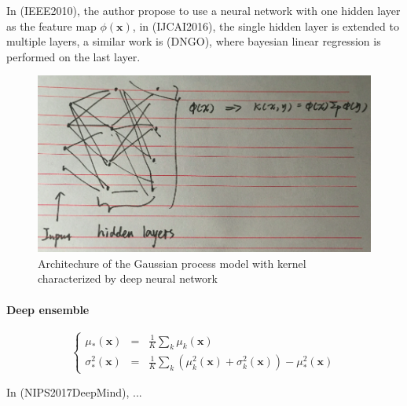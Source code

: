\begin{equation}
\end{equation}

\begin{equation}
\end{equation}

In (IEEE2010), the author propose to use a neural network with one hidden layer as the feature map $\phi(\bm{x})$, in (IJCAI2016), the single hidden layer is extended to multiple layers, a similar work is (DNGO), where bayesian linear regression is performed on the last layer. 

\begin{figure}[!htb]
    \centering
    \includegraphics[width=\columnwidth]{./img/NN-GP.png}
    \caption{Architechure of the Gaussian process model with kernel characterized by deep neural network}
\end{figure}

\paragraph{Deep ensemble}

\begin{equation}
    \left\{
        \begin{array}{lll}
            \mu_*(\bm{x})      &=& \frac{1}{K} \sum_k \mu_k(\bm{x}) \\
            \sigma_*^2(\bm{x}) &=& \frac{1}{K} \sum_k (\mu_k^2(\bm{x}) + \sigma_k^2(\bm{x})) - \mu_*^2(\bm{x})
        \end{array}
    \right.
\end{equation}

In (NIPS2017DeepMind), ...
